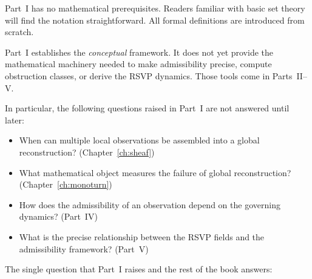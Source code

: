 \bigskip

\begin{tcolorbox}[
  title={\textbf{Dependencies}},
  colback=boxgray,colframe=gray!50!black,
  fonttitle=\small\sffamily
]
Part~I has no mathematical prerequisites.
Readers familiar with basic set theory will find the notation
straightforward.
All formal definitions are introduced from scratch.
\end{tcolorbox}

\bigskip

\begin{tcolorbox}[
  title={\textbf{What Remains Open After This Part}},
  colback=boxorange,colframe=orange!60!black,
  fonttitle=\small\sffamily
]
Part~I establishes the \emph{conceptual} framework.
It does not yet provide the mathematical machinery needed
to make admissibility precise, compute obstruction classes,
or derive the RSVP dynamics.
Those tools come in Parts~II--V\@.

In particular, the following questions raised in Part~I
are not answered until later:
\begin{itemize}[leftmargin=1.5em,itemsep=2pt]
  \item When can multiple local observations be assembled into
    a global reconstruction? (Chapter~\ref{ch:sheaf})
  \item What mathematical object measures the failure of
    global reconstruction? (Chapter~\ref{ch:monoturn})
  \item How does the admissibility of an observation depend
    on the governing dynamics? (Part~IV)
  \item What is the precise relationship between the RSVP
    fields and the admissibility framework? (Part~V)
\end{itemize}
\end{tcolorbox}

\bigskip

\noindent
The single question that Part~I raises and the rest of the book
answers:

